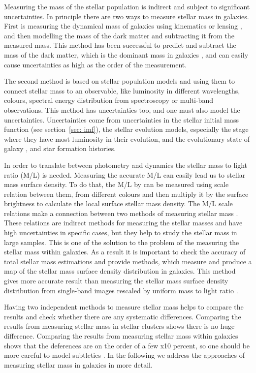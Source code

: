 Measuring the mass of the stellar population is indirect and subject to significant uncertainties. In principle there are two ways to measure stellar mass in galaxies. First is measuring the dynamical mass of galaxies using kinematics \citep{Cappellari06} or lensing \citep{Auger09}, and then modelling the mass of the dark matter and subtracting it from the measured mass. This method has been successful to predict and subtract the mass of the dark matter, which is the dominant mass in galaxies \citep{Zaritsky94},  and can easily cause uncertainties as high as the order of the measurement. 

The second method is based on stellar population models \citep[e.g.][]{ Bruzual93, Kotulla09} and using them to connect stellar mass to an observable, like luminosity in different wavelengths, colours, spectral energy distribution from spectroscopy or multi-band observations. This method has uncertainties too, and one must also model the uncertainties. Uncertainties come from uncertainties in the stellar initial mass function (see section{~\ref{sec: imf}}), the stellar evolution models, especially the stage where they have most luminosity in their evolution, and the evolutionary state of galaxy \citep[see,][]{Dalcanton12}, and star formation histories. 

In order to translate between photometry and dynamics the stellar mass to light ratio (M/L) is needed. Measuring the accurate M/L can easily lead us to stellar mass surface density.  To do that, the M/L by can be measured using scale relation between them, from different colours and then multiply it by the surface brightness to calculate the local surface stellar mass density. The M/L scale relations make a connection between two methods of measuring stellar mass \citep{Bell03}. These relations are indirect methods for measuring the stellar masses and have high uncertainties in specific cases, but they help to study the stellar mass in large samples. This is one of the solution to the problem of the measuring the stellar mass within galaxies. As a result it is important to check the accuracy of total stellar mass estimations and provide methods, which measure and produce a map of the stellar mass surface density distribution in galaxies. This method gives more accurate result than measuring the stellar mass surface density distribution from single-band images rescaled by uniform mass to light ratio \cite{Zibetti09}.
 
Having two independent methods to measure stellar mass helps to compare the results and check whether there are any systematic differences. Comparing the results from measuring stellar mass in stellar clusters shows there is no huge difference. Comparing the results from measuring stellar mass within galaxies shows that the deferences are on the order of a few x10 percent, so one should be more careful to model subtleties \citep{McLaughlin05}. In the following we address the approaches of measuring stellar mass in galaxies in more detail.

